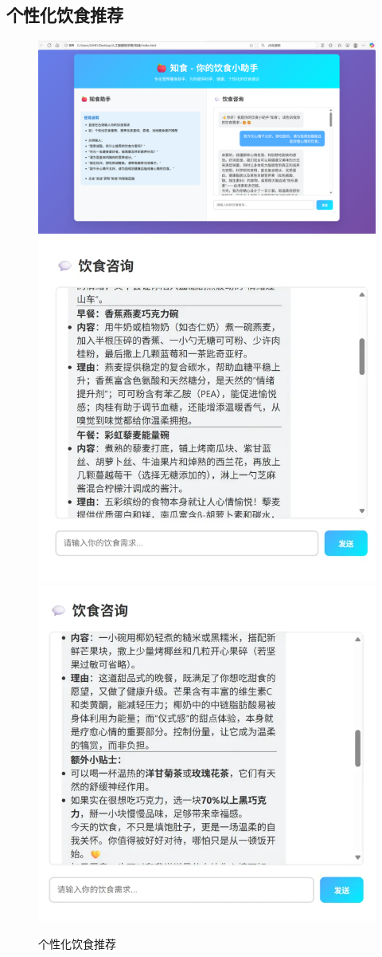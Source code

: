 \documentclass[a4paper,UTF8]{ctexart}
\begin{document}
\subsection{个性化饮食推荐}
\begin{figure}[H]
    \centering
    \includegraphics[width=0.8\linewidth,height=0.3\textheight,keepaspectratio]{1.png}\\[1ex]
    \includegraphics[width=0.8\linewidth,height=0.3\textheight,keepaspectratio]{2.png}\\[1ex]
    \includegraphics[width=0.8\linewidth,height=0.3\textheight,keepaspectratio]{3.png}
    \caption{个性化饮食推荐}
    \label{fig:diet_recommend}
\end{figure}
\end{document}
